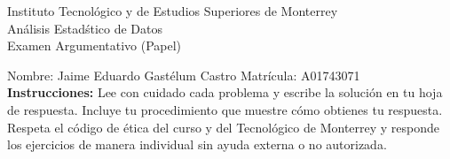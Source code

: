 \documentclass[10pt]{report}
\begin{document}
\newpage



\begin{center}
{\large Instituto Tecnol\'{o}gico y de Estudios Superiores de Monterrey \\
An\'alisis Estad\'stico de Datos } \\
Examen Argumentativo (Papel)
\end{center}

Nombre: \underline{\hspace*{.2in}}
Jaime Eduardo Gast\'elum Castro
\underline{\hspace*{.2in}} \quad Matr\'icula:\underline{\hspace*{.2in}}
A01743071
\underline{\hspace*{.2in}} \\

{\bf Instrucciones:} Lee con cuidado cada problema y escribe la soluci\'on
en tu hoja de respuesta. Incluye tu procedimiento que muestre c\'omo obtienes tu respuesta.  Respeta el c\'odigo de \'etica del curso y del Tecnol\'ogico de Monterrey y responde los ejercicios de manera individual sin ayuda externa o no autorizada.
\end{document}
